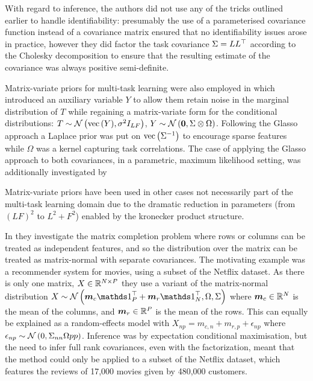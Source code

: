 With regard to inference, the authors did not use any of the tricks outlined earlier to handle identifiability: presumably the use of a parameterised covariance function instead of a covariance matrix ensured that no identifiability issues arose in practice, however they did factor the task covariance $\Sigma = L L^\top$ according to the Cholesky decomposition to ensure that the resulting estimate of the covariance was always positive semi-definite. 


Matrix-variate priors for multi-task learning were also employed in \cite{Stegle2011} which introduced an auxiliary variable $Y$ to allow them retain noise in the marginal distribution of $T$ while regaining a matrix-variate form for the conditional distributions: $T\sim\mathcal{N} \left( {\text{vec}\left(Y\right)}, {\sigma^2 I_{LF}} \right)$, $Y\sim\mathcal{N} \left( {\bm 0}, {\Sigma \otimes \Omega} \right)$. Following the Glasso approach a Laplace prior was put on $\text{vec}\left({\Sigma}^{-1}\right)$ to encourage sparse features while $\Omega$ was a kernel capturing task correlations. The case of applying the Glasso approach to both covariances, in a parametric, maximum likelihood setting, was additionally investigated by \cite{Tsiligkaridis2012b}\cite{Tsiligkaridis2012}


Matrix-variate priors have been used in other cases not necessarily part of the multi-task learning domain due to the dramatic reduction in parameters (from $(LF)^2$ to $L^2 + F^2$) enabled by the kronecker product structure.

In \cite{Allen2010} they investigate the matrix completion problem where rows or columns can be treated as independent features, and so the distribution over the matrix can be treated as matrix-normal with separate covariances. The motivating example was a recommender system for movies, using a subset of the Netflix dataset. As there is only one matrix, $X \in { \mathbb{R}^{N \times P} }$ they use a variant of the matrix-normal distribution $X \sim \mnor{\vv{m}_c \one_P\T + \vv{m}_r \one_N\T}{\Omega}{\Sigma}$ where $\bm m_c \in { \mathbb{R}^{N} }$ is the mean of the columns, and $\bm m_r \in { \mathbb{R}^{P} }$ is the mean of the rows. This can equally be explained as a random-effects model with $X_{np} = m_{c,n} + m_{r,p} + \epsilon_{np}$ where $\epsilon_{np} \sim \mathcal{N} \left( {0}, {\Sigma_{nn}\Omega{pp}} \right)$. Inference was by expectation conditional maximisation, but the need to infer full rank covariances, even with the factorization, meant that the method could only be applied to a subset of the Netflix dataset, which features the reviews of 17,000 movies given by 480,000 customers. 

